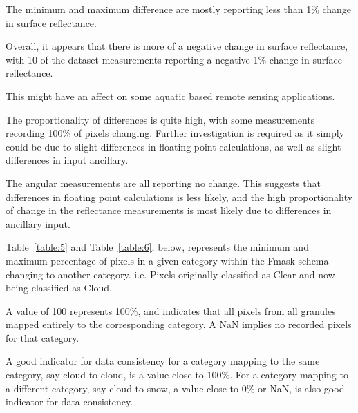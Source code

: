 \documentclass[a4paper]{article}
\begin{document}
      \begin{flushleft}
        The minimum and maximum difference are mostly reporting less than 1\% change in surface reflectance. \par
        Overall, it appears that there is more of a negative change in surface reflectance, with 10 of the dataset measurements reporting a negative 1\% change in surface reflectance. \par
        This might have an affect on some aquatic based remote sensing applications. \par
        The proportionality of differences is quite high, with some measurements recording 100\% of pixels changing. Further investigation is required as it simply could be due to slight differences in floating point calculations, as well as slight differences in input ancillary. \par
        The angular measurements are all reporting no change. This suggests that differences in floating point calculations is less likely, and the high proportionality of change in the reflectance measurements is most likely due to differences in ancillary input.
      \end{flushleft}


      \begin{flushleft}
        Table~\ref{table:5} and Table~\ref{table:6}, below, represents the minimum and maximum percentage of pixels in a given category within the Fmask schema changing to another category. i.e. Pixels originally classified as Clear and now being classified as Cloud. \par
        A value of 100 represents 100\%, and indicates that all pixels from all granules mapped entirely to the corresponding category. A NaN implies no recorded pixels for that category. \par
        A good indicator for data consistency for a category mapping to the same category, say cloud to cloud, is a value close to 100\%. For a category mapping to a different category, say cloud to snow, a value close to 0\% or NaN, is also good indicator for data consistency.
      \end{flushleft}

  \clearpage
\end{document}
